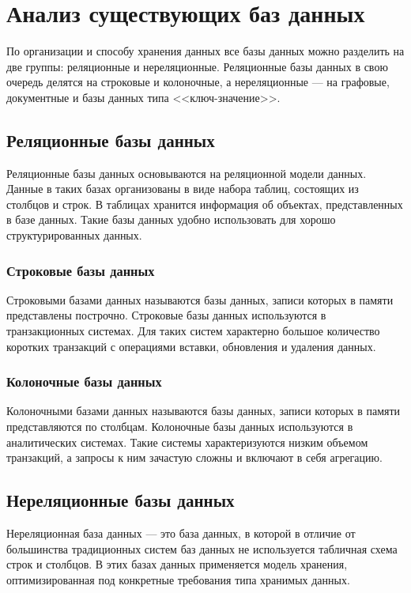 \section{Анализ существующих баз данных}

По организации и способу хранения данных все базы данных можно разделить на две группы: реляционные и нереляционные. Реляционные базы данных в свою очередь делятся на строковые и колоночные, а нереляционные --- на графовые, документные и базы данных типа <<ключ-значение>>.

\subsection{Реляционные базы данных}

Реляционные базы данных основываются на реляционной модели данных. Данные в таких базах организованы в виде набора таблиц, состоящих из столбцов и строк. В таблицах хранится информация об объектах, представленных в базе данных. Такие базы данных удобно использовать для хорошо структурированных данных.

\subsubsection{Строковые базы данных}

Строковыми базами данных называются базы данных, записи которых в памяти представлены построчно. Строковые базы данных используются в транзакционных системах. Для таких систем характерно большое количество коротких транзакций с операциями вставки, обновления и удаления данных.

\subsubsection{Колоночные базы данных}

Колоночными базами данных называются базы данных, записи которых в памяти представляются по столбцам. Колоночные базы данных используются в аналитических системах. Такие системы характеризуются низким объемом транзакций, а запросы к ним зачастую сложны и включают в себя агрегацию.

\subsection{Нереляционные базы данных}

Нереляционная база данных --- это база данных, в которой в отличие от большинства традиционных систем баз данных не используется табличная схема строк и столбцов. В этих базах данных применяется модель хранения, оптимизированная под конкретные требования типа хранимых данных.

